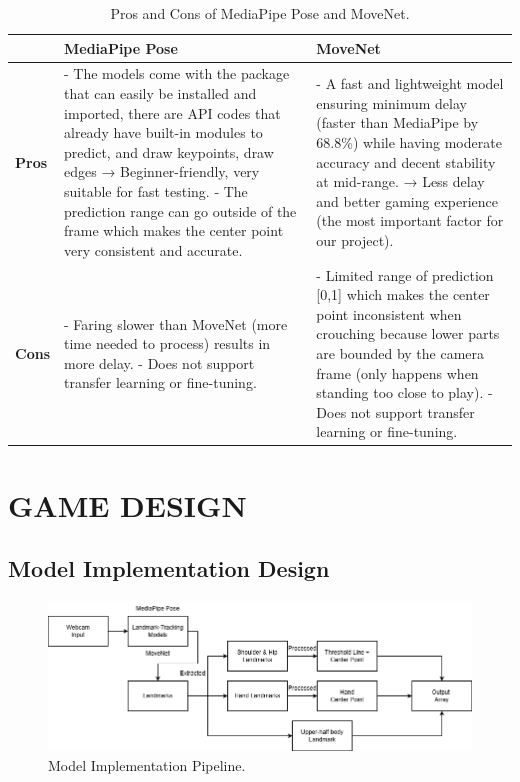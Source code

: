 \documentclass[12pt]{article}
\begin{document}
    \begin{table}[h]
    \centering
    \caption{Pros and Cons of MediaPipe Pose and MoveNet.}
    \begin{adjustbox}{width=\textwidth}
    \begin{tabular}{|l|p{}|p{}|}
    \hline
     & \textbf{MediaPipe Pose} & \textbf{MoveNet} \\
     \hline
    \textbf{Pros} & 
    - The models come with the package that can easily be installed and imported, there are API codes that already have built-in modules to predict, and draw keypoints, draw edges \newline
    → Beginner-friendly, very suitable for fast testing. \newline
    - The prediction range can go outside of the frame which makes the center point very consistent and accurate. & 
    - A fast and lightweight model ensuring minimum delay (faster than MediaPipe by 68.8\%) while having moderate accuracy and decent stability at mid-range. \newline
    → Less delay and better gaming experience (the most important factor for our project). \\
    \hline
    \textbf{Cons} & 
    - Faring slower than MoveNet (more time needed to process) results in more delay. \newline
    - Does not support transfer learning or fine-tuning. & 
    - Limited range of prediction [0,1] which makes the center point inconsistent when crouching because lower parts are bounded by the camera frame (only happens when standing too close to play). \newline
    - Does not support transfer learning or fine-tuning. \\
    \hline
    \end{tabular}
    \end{adjustbox}
    \end{table}
\clearpage

\section{GAME DESIGN}
\subsection{Model Implementation Design}

\begin{figure}[ht]
    \centering
    \includegraphics[width=1\textwidth]{ModelIm.drawio.png}
    \caption{Model Implementation Pipeline.}
\end{figure}
\end{document}
